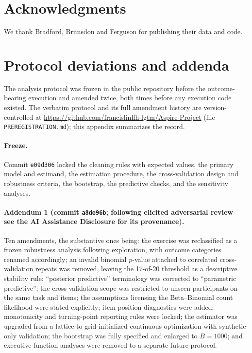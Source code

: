 \documentclass[11pt]{article}
\newcommand{\repo}{\url{https://github.com/francislinlfh-lgtm/Aspire-Project}}
\begin{document}
\section*{Acknowledgments}
We thank Bradford, Brunsdon and Ferguson for publishing their data and code.




\appendix
\section{Protocol deviations and addenda}\label{app:addenda}

The analysis protocol was frozen in the public repository before the
outcome-bearing execution and amended twice, both times before any execution
code existed. The verbatim protocol and its full amendment history are
version-controlled at \repo{} (file \texttt{PREREGISTRATION.md}); this appendix
summarizes the record.

\paragraph{Freeze.} Commit \texttt{e09d306} locked the cleaning rules with
expected values, the primary model and estimand, the estimation procedure, the
cross-validation design and robustness criteria, the bootstrap, the predictive
checks, and the sensitivity analyses.

\paragraph{Addendum 1 (commit \texttt{a8de96b}; following elicited adversarial
review --- see the AI Assistance Disclosure for its provenance).}
Ten amendments, the substantive ones being: the exercise was reclassified as a
frozen robustness analysis following exploration, with outcome categories
renamed accordingly; an invalid binomial $p$-value attached to correlated
cross-validation repeats was removed, leaving the 17-of-20 threshold as a
descriptive stability rule; ``posterior predictive'' terminology was corrected
to ``parametric predictive''; the cross-validation scope was restricted to
unseen participants on the same task and items; the assumptions licensing the
Beta--Binomial count likelihood were stated explicitly; item-position
diagnostics were added; monotonicity and turning-point reporting rules were
locked; the estimator was upgraded from a lattice to grid-initialized
continuous optimization with synthetic-only validation; the bootstrap was fully
specified and enlarged to $B = 1000$; and executive-function analyses were
removed to a separate future protocol.
\end{document}
